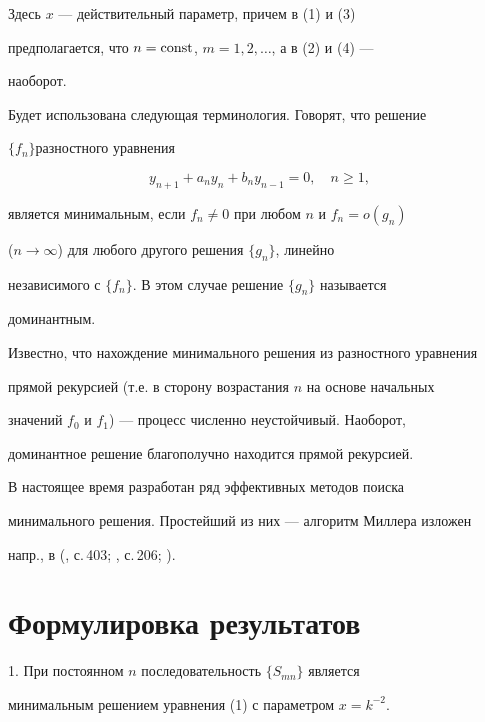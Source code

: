 Здесь $x$ --- действительный параметр, причем в (1) и (3) 


предполагается, что $n=\operatorname{const}$, $m=1,2,\dotsc$, а в (2) и (4) --- 


наоборот. 


 


Будет использована следующая терминология. Говорят, что решение 


$\{f_n\}$разностного уравнения 


$$ 


y_{n+1}+a_n y_n+b_n y_{n-1}=0,\quad n\ge 1, 


$$ 


является минимальным, если $f_n\ne0$ при любом $n$ и $f_n=o(g_n)$ 


($n\to\infty$) для любого другого решения $\{g_n\}$, линейно 


независимого с $\{f_n\}$. В этом случае решение $\{g_n\}$ называется 


доминантным. 


 


Известно, что нахождение минимального решения из разностного уравнения 


прямой рекурсией (т.е. в сторону возрастания $n$ на основе начальных 


значений $f_0$ и $f_1$) --- процесс численно неустойчивый. Наоборот, 


доминантное решение благополучно находится прямой рекурсией. 


 


В настоящее время разработан ряд эффективных методов поиска 


минимального решения. Простейший из них --- алгоритм Миллера изложен 


напр., в (\cite{4}, с.\,403; \cite{5}, с.\,206; \cite{6}). 


 


\section*{Формулировка результатов} 


 


1. При постоянном $n$ последовательность $\{S_{mn}\}$ является 


минимальным решением уравнения (1) с параметром $x=k^{-2}$. 


